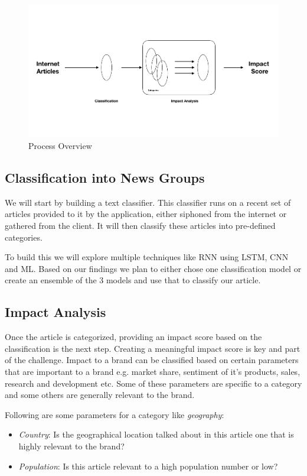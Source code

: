 \documentclass{article}
\begin{document}
\begin{figure}
	\centering
 	 \includegraphics[width=0.6\linewidth]{impact_score.png}
	  \caption{Process Overview}
 	 \label{fig:Impact Potential}
\end{figure}

\subsection{Classification into News Groups}

We will start by building a text classifier. This classifier runs on a recent set of articles provided to it by the application, either siphoned from the internet or gathered from the client. It will then classify these articles into pre-defined categories. 

To build this we will explore multiple techniques like RNN using LSTM, CNN and ML. Based on our findings we plan to either chose one classification model or create an ensemble of the 3 models and use that to classify our article. 

\subsection{Impact Analysis}
Once the article is categorized, providing an impact score based on the classification is the next step. Creating a meaningful impact score is key and part of the challenge. Impact to a brand can be classified based on certain parameters that are important to a brand e.g. market share, sentiment of it's products, sales, research and development etc. Some of these parameters are specific to a category and some others are generally relevant to the brand.

Following are some parameters for a category like \textit{geography}:
\begin{itemize}
	\item \textit{Country}: Is the geographical location talked about in this article one that is highly relevant to the brand?
	\item \textit{Population}: Is this article relevant to a high population number or low?
\end{itemize}
\end{document}
